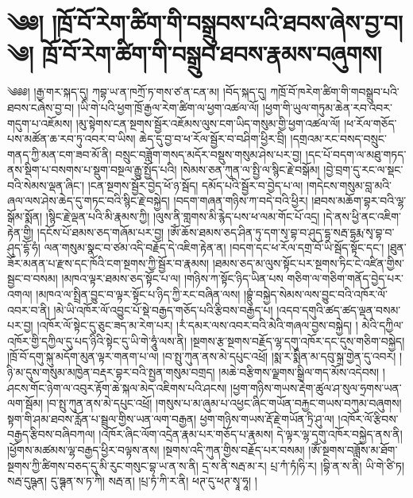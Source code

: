 \setcounter{footnote}{0} 
\chapter{༄༅། །ཁྲོ་བོ་རེག་ཚིག་གི་བསྒྲུབས་པའི་ཐབས་ཞེས་བྱ་བ། ༄། ཁྲོ་བོ་རེག་ཚིག་གི་བསྒྲུབ་ཐབས་རྣམས་བཞུགས། }༄༅༅། །རྒྱ་གར་སྐད་དུ། ཀབྷ་ཡ་ན་ཁཀྲོ་ཏ་གས་ཙ་ན་ངན་མ། །བོད་སྐད་དུ། ཀཁྲོ་བོ་ཁརེག་ཚིག་གི་གབསྒྲུབ་པའི་ཐབས་ངཞེས་བྱ་བ། །ཡི་གེ་པའི་ཕྱག་ཁྲོ་རྒྱལ་རེག་ཚིག་ལ་ཕྱག་འཚལ་ལོ། །ཕྱག་གི་ཡུལ་གཏུམ་ཆེན་རབ་འབར་གདུག་པ་འཇོམས། །མུ་སྟེགས་ངན་སྔགས་སྦྱོར་འཇོམས་ལུས་ངག་ཡིད་གསུམ་གྱི་ཕྱག་འཚལ་ལོ། །ཕ་རོལ་གཅོད་པས་མཚོན་ཆ་རབ་ཏུ་འབར་བ་ཡིས། ཆེད་དུ་བྱ་བ་ཕ་རོལ་སྦྱོར་བ་བཤིག་ཕྱིར་བྲི། །དགྲའམ་རང་བསད་བསྲུང་གནད་ཀྱི་མན་ངག་ཟབ་མོ་ནི། བསྲུང་བཟློག་གསད་མདོར་བསྡུས་གསུམ་ཤེས་པར་བྱ། །དང་པོ་བདག་ལ་མཐུ་གཏད་ནས་སྡིག་པ་བསགས་པ་སྡུག་བསྔལ་རྒྱུ་སྤྱོད་པའི། །སེམས་ཅན་ཀུན་ལ་སྤྱི་ལ་སྙིང་རྗེ་བསྒོམ། །བྱེ་བྲག་དུ་རང་ལ་སྡང་བའི་སེམས་ལྡན་ཞིང་། །ངན་སྔགས་སྦྱོར་བྱེད་ཕོ་ཉ་སྦོད། དམོད་པའི་སྦྱོར་བ་བྱེད་པ་ལ། །གདེངས་གསུམ་བླ་མའི་ཞལ་ལས་ཤེས་ཆེད་དུ་གཏང་བའི་སྙིང་རྗེ་བསྐྱེད། །བདག་གཞན་གཉིས་ཀ་བདེ་བའི་ཕྱིར། །ཐབས་མཆོག་བྷར་བའི་ལྷ་སྒོམ་སྨོན། །སྙིང་རྗེ་ལྡན་པའི་མི་རྣམས་ཀྱི། །ལུས་ནི་གླགས་མི་རྙེད་པས་ཕ་ལམ་གོང་པོ་འདྲ། །དེ་ནས་ཕྱི་ནང་འཇིག་རྟེན་གྱི། །དངོས་པོ་ཐམས་ཅད་གཞོམ་པར་བྱ། །ཨོཾ་ཆོས་ཐམས་ཅད་ཤིན་ཏུ་དག་སྭ་བྷ་བ་ཤུད་དྷ་སརྦ་དྷརྨ་སྭ་བྷ་བ་ཤུད་དྷོ་ཧཾ། ལན་གསུམ་སྣང་བ་ཙམ་འདི་བརྗོད་དེ་འཇིག་རྟེན་ན། །བདག་དང་ཕ་རོལ་དགྲ་བོ་ཡི་སྦོད་སྟོང་དང་། །ཐུན་ཟོར་མནན་པ་རྫས་དང་ཁོའི་ངག་སྔགས་ཀྱི་སྦྱོར་བ་རྣམས། །ཐམས་ཅད་མ་ལུས་སྟོང་པར་སྔགས་ཏིང་ངེ་འཛིན་གྱིས་སྦྱང་བ་བསམ། །མཁའ་ལྟར་ཐམས་ཅད་སྟོང་པ་ལ། །གཉིས་ཀ་སྟོང་ཉིད་ཡིན་པས གཅིག་ལ་གཅིག་གནོད་བྱེད་པར་འགལ། །མཁའ་ལ་སྤྲིན་བྱུང་བ་ལྟར་སྟོང་པ་ཉིད་ཀྱི་རང་བཞིན་ལས། །བྷྲུཾ་བསྐྱེད་སེམས་ལས་བྱུང་བའི་འཁོར་ལོ་འབར་བ་ནི། །མེ་ཡི་འཁོར་ལོ་འབྱུང་པོ་སྡེ་བརྒྱད་གཅོད་པའི་རྩིབས་བརྒྱད་པ། །འདབ་དགུའི་ཚད་ཚད་ལྡན་བསམ་པར་བྱ། །འཁོར་ལོ་སྟེང་དུ་ཅུང་ཟད་མ་རེག་པར། །རཾ་དམར་ལས་འབར་བའི་མེའི་གཞལ་བྱས་བསྐྱེད། ། མེའི་དཀྱིལ་འཁོར་གྱི་དཀྱིལ་དུ་པད་ཉིའི་སྟེང་དུ་ཡི་གེ་ཧཱུཾ་ལས་ནི། །སྔགས་རྩ་སྔགས་བརྗོད་ལྷ་དགུ་འཁོར་དང་དུས་གཅིག་བསྐྱེད། །ཁྲོ་བོ་དགུ་སྐུ་མདོག་མུན་ལྟར་གནག་པ་ལ། །བ་སྤུ་ཀུན་ནས་མེ་དཔུང་འཕྲོ། །སྨ་ར་སྨིན་མ་དབུ་སྐྲ་གྱེན་དུ་འབར། །ཉི་མ་དུས་གསུམ་མཁྱེན་བརྡར་བྷར་བའི་སྤྱན་གསུམ་བགྲད། །མཆེ་བརྩིགས་ལྗགས་སྒྲིལ་གད་མོས་འདེབས། །ཤངས་གོང་ཉེག་ལ་འབུར་རྟོག་ཆེ་སྐལ་མེད་འཇིགས་པའི་ཤངས། །ཕྱག་གཉིས་གཡས་རྡེག་ཚུལ་ཤ་སུལ་ཧྲགས་ཡན་ལག་སྦོམ། །བ་སྤུ་ཀུན་ནས་མེ་དཔུང་འཕྲོ། །གསུས་པ་མ་ཞུམ་པ་འཕྱང་ཞིང་གཡོན་བརྐྱང་གཡས་བཀུམ་བཞུགས། སྟག་གི་ཤམ་ཐབས་རློན་པ་སྦྲུལ་གྱིས་ཡན་ལག་བརྒྱན། ཕྱག་གཉིས་གཡས་རྡོ་རྗེ་གཡོན་ཏྲི་ཤུ་ལ། །འཁོར་ལོ་རྩིབས་བརྒྱད་རྩིབས་བཞིབཀལ། །འཁོར་ཞིང་ལོག་འདྲེན་རྣམ་པར་གཅོད་པ་རྣམས། དེ་ལྟར་ལྷ་དགུ་འཁོར་བསྐྱེད་ནས་ནི། །ཕྱོགས་མཚམས་ལྷ་བརྒྱད་ཕྱིར་བལྟས་ནས། །སྔགས་འདི་ཀུན་གྱིས་བརྗོད་པར་བསམ། །ཨོཾ་སྔགས་བཟློས་མ་ཐོག་སྔགས་ཀྱི་ཚིགས་བཅད་དུ་མི་རུང་གསུང་བྷ་ཡ་ན་ས་ནི། དྲ་ས་ནི་སརྦ་མ་ར། པྲ་ཀཾ་ཏཾ།ཧི་ར། །བྷི་ན་ས་ནི། ཡི་གེ་ཙི་ཏ། སརྦ་དུཥྚན། དུ་ཋྚན་ས་ཏ་ཀི། སརྦ་ན། །པྲ་ཏཾ་ཀི་ར་ནི། ཕཊ་དུ་ཕཊ་སྭཱ་ཧཱ། །
